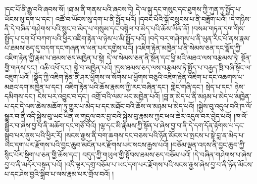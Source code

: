 །དང་པོ་ནི་རྒྱུ་བའི་ཞབས་སོ། །ཐ་མ་ནི་གནས་པའི་ཞབས་ཏེ། དེ་ལ་སྐུ་དང་གསུང་དང་ཐུགས་ཀྱི་ཀུན་ཏུ་སྤྱོད་པ་ཡོངས་སུ་དག་པ་དང་། འཚོ་བ་ཡོངས་སུ་དག་པ་ནི་སྤྱོད་པའོ། །དབང་པོའི་སྒོ་བསྲུངས་པ་ནི་བཟློག་པའོ། །དེ་གཉིས་ནི་དེ་བཞིན་གཤེགས་པའི་སྲུང་བ་མེད་པ་གསུམ་དང་བསྙེལ་བ་མེད་པའི་ཆོས་ཡིན་ནོ། །བསམ་གཏན་དག་གིས་སྤྱོད་པ་དྲག་པོ་བཀག་པའི་ཕྱིར་འཇིག་རྟེན་ལ་ཉེས་པ་མི་སྤྱོད་པའོ། །བདེ་བར་གཤེགས་པ་ནི་ཡུན་རིང་པོ་ནས་རྣམ་པ་ཐམས་ཅད་དུ་བདག་དང་གཞན་ལ་ཕན་པར་དགྱེས་པའོ། །འཇིག་རྟེན་མཁྱེན་པ་ནི་སེམས་ཅན་དང་སྣོད་ཀྱི་འཇིག་རྟེན་གྱི་རྣམ་པ་ཐམས་ཅད་མཁྱེན་པ་སྟེ། དེ་ལ་སེམས་ཅན་ནི་སྔོན་དང་ཕྱི་མའི་མཐའ་ལས་བརྩམས་ཏེ། སྔོན་གྱི་གནས་དང་། འཆི་འཕོ་དང་། སྐྱེ་བ་མཁྱེན་པའོ། །དུས་ཐམས་ཅད་ལས་བརྩམས་ཏེ་སྤྱོད་པ་བརྒྱད་ཁྲི་བཞི་སྟོང་ལ་འཇུག་པའོ། །སྣོད་ཀྱི་འཇིག་རྟེན་ནི་ཤར་ཕྱོགས་ལ་སོགས་པ་ཕྱོགས་བཅུའི་འཇིག་རྟེན་འཇིག་པ་དང་འཆགས་པ་མཐའ་དག་མཁྱེན་པ་དང་། འཇིག་རྟེན་པའི་ཆོས་རྣམས་ཀྱི་རང་བཞིན་དང་། གླེང་གཞི་དང་། སྲེད་པ་དང་། ཉེས་དམིགས་དང་། ངེས་པར་འབྱུང་བ་དང་། འགྲོ་བའི་ལམ་ཡང་མཁྱེན་པའོ། །བླ་ན་མེད་པ་ནི་མཉམ་པ་མེད་པ་མཁྱེན་པ་དང་དེ་ལས་ཆེས་མཆོག་ཏུ་གྱུར་པ་མེད་པ་དང་མཐོང་བའི་ཆོས་ལ་མཉམ་པ་མེད་པའོ། །སྐྱེས་བུ་འདུལ་བའི་ཁ་ལོ་སྒྱུར་བ་ནི་འདི་སྐྱེས་བུ་ཡང་ཡིན་ལ་གདུལ་བར་བྱ་བའི་སྐྱེས་བུ་རྣམས་ཀྱང་ཕལ་ཆེར་འདུལ་བར་བྱེད་པའོ། །ཁ་ལོ་སྒྱུར་བ་ཞེས་བྱ་བ་ནི་མཆོག་དང་གཙོ་བོའོ། །ལྷ་དང་མི་རྣམས་ཀྱི་སྟོན་པ་ཞེས་བྱ་བ་ནི་དེ་དག་དོན་རྟོགས་པ་དང་སྒྲུབ་པར་ནུས་པའི་ཕྱིར་རོ། །སངས་རྒྱས་ནི་བག་ཆགས་དང་བཅས་པའི་ཉོན་མོངས་པ་སྤངས་པ་སྟེ་བླ་ན་མེད་པ་ཡང་དག་པར་རྫོགས་པའི་བྱང་ཆུབ་མངོན་པར་རྫོགས་པར་སངས་རྒྱས་པའོ། །བཅོམ་ལྡན་འདས་ནི་བྱང་ཆུབ་ཀྱི་སྙིང་པོར་སྡིག་པ་ཅན་གྱི་ཆོས་དང་། བདུད་ཀྱི་གཡུལ་གྱི་སྟོབས་ཐམས་ཅད་བཅོམ་པའོ། །དེ་བཞིན་གཤེགས་པ་ཞེས་བྱ་བ་ནི་མདོར་བསྟན་པའོ། །འདི་ལྟར་དགྲ་བཅོམ་པ་ཡང་དག་པར་རྫོགས་པའི་སངས་རྒྱས་ཞེས་བྱ་བ་ནི་ཉོན་མོངས་པ་དང་ཤེས་བྱའི་སྒྲིབ་པ་ལས་རྣམ་པར་གྲོལ་བའོ། །
